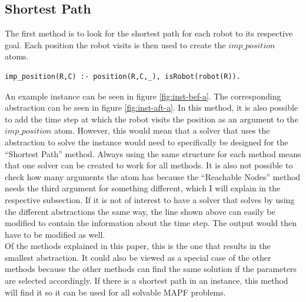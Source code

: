 \documentclass[runningheads]{llncs}
\begin{document}
\subsection{Shortest Path}
The first method is to look for the shortest path for each robot to its respective goal. Each position the robot visits is then used to create the $imp\_position$ atoms. 
\begin{verbatim}
imp_position(R,C) :- position(R,C,_), isRobot(robot(R)).
\end{verbatim}
An example instance can be seen in figure \ref{fig:inst-bef-a}. The corresponding abstraction can be seen in figure \ref{fig:inst-aft-a}.
In this method, it is also possible to add the time step at which the robot visits the position as an argument to the $imp\_position$ atom. However, this would mean that a solver that uses the abstraction to solve the instance would need to specifically
be designed for the ``Shortest Path'' method. Always using the same structure for each method means that one solver can be created to work for all methods. It is also not possible to check how many arguments the atom has because the 
``Reachable Nodes'' method needs the third argument for something different, which I will explain in the respective subsection. If it is not of interest to have a solver that solves by using the different abstractions the same way, the line shown above can 
easily be modified to contain the information about the time step. The output would then have to be modified as well. \\
Of the methods explained in this paper, this is the one that results in the smallest abstraction. It could also be viewed as a special case of the other methods because the other methods can find the same solution if the parameters are selected accordingly. If there is a shortest path in an instance, this method will find it so it can be used for all solvable
MAPF problems. 
\end{document}
